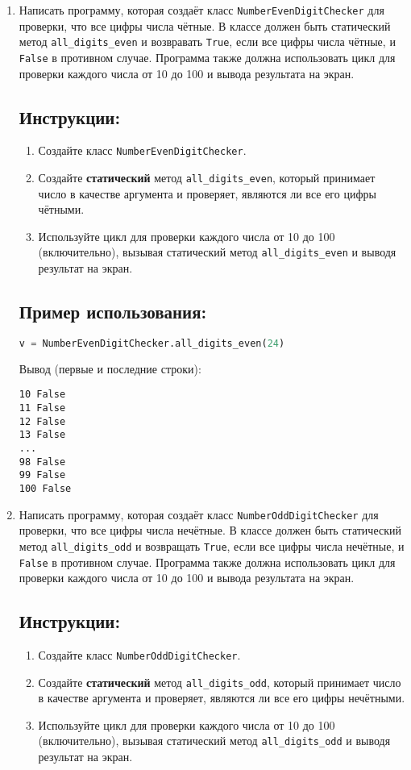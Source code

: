 \begin{enumerate}
\item
Написать программу, которая создаёт класс \texttt{NumberEvenDigitChecker} 
для проверки, что все цифры числа чётные. В классе должен быть статический метод
\texttt{all\_digits\_even} и возвравать \texttt{True}, если все цифры числа чётные, 
и \texttt{False} в противном случае. 
Программа также должна использовать цикл для проверки каждого числа от 
10 до 100 и вывода результата на экран.

\subsection*{Инструкции:}
\begin{enumerate}
    \item Создайте класс \texttt{NumberEvenDigitChecker}.
    \item Создайте \textbf{статический} метод \texttt{all\_digits\_even}, который принимает число в качестве аргумента и проверяет, являются ли все его цифры чётными.
    \item Используйте цикл для проверки каждого числа от 10 до 100 (включительно), вызывая статический метод \texttt{all\_digits\_even} и выводя результат на экран.
\end{enumerate}

\subsection*{Пример использования:}
\begin{lstlisting}[language=Python]
    v = NumberEvenDigitChecker.all_digits_even(24)
\end{lstlisting}
Вывод (первые и последние строки):
\begin{verbatim}
10 False
11 False
12 False
13 False
...
98 False
99 False
100 False
\end{verbatim}

\item
Написать программу, которая создаёт класс \texttt{NumberOddDigitChecker} 
для проверки, что все цифры числа нечётные. В классе должен быть статический метод
\texttt{all\_digits\_odd} и возвращать \texttt{True}, если все цифры числа нечётные, 
и \texttt{False} в противном случае. 
Программа также должна использовать цикл для проверки каждого числа от 
10 до 100 и вывода результата на экран.

\subsection*{Инструкции:}
\begin{enumerate}
    \item Создайте класс \texttt{NumberOddDigitChecker}.
    \item Создайте \textbf{статический} метод \texttt{all\_digits\_odd}, который принимает число в качестве аргумента и проверяет, являются ли все его цифры нечётными.
    \item Используйте цикл для проверки каждого числа от 10 до 100 (включительно), вызывая статический метод \texttt{all\_digits\_odd} и выводя результат на экран.
\end{enumerate}


\end{enumerate}
